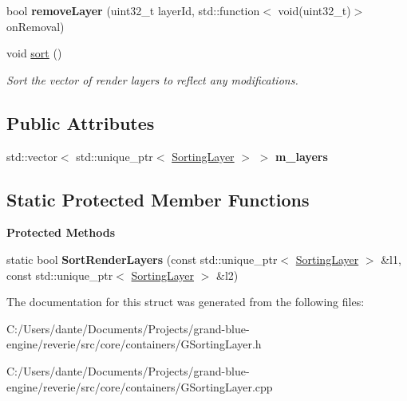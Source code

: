 \begin{DoxyCompactItemize}
\mbox{\label{structrev_1_1_sorting_layers_ad21276d3f1bbfc243c28c5a69580fe5d}} 
bool {\bfseries remove\+Layer} (uint32\+\_\+t layer\+Id, std\+::function$<$ void(uint32\+\_\+t)$>$ on\+Removal)
\item 
\mbox{\label{structrev_1_1_sorting_layers_a1a3e2f464d22ad1096144b57239e0ac3}} 
void \mbox{\hyperlink{structrev_1_1_sorting_layers_a1a3e2f464d22ad1096144b57239e0ac3}{sort}} ()
\begin{DoxyCompactList}\small\item\em Sort the vector of render layers to reflect any modifications. \end{DoxyCompactList}\end{DoxyCompactItemize}
\subsection*{Public Attributes}
\begin{DoxyCompactItemize}
\item 
\mbox{\label{structrev_1_1_sorting_layers_a49f65706af0d9bc9be933516f9cce5f9}} 
std\+::vector$<$ std\+::unique\+\_\+ptr$<$ \mbox{\hyperlink{structrev_1_1_sorting_layer}{Sorting\+Layer}} $>$ $>$ {\bfseries m\+\_\+layers}
\end{DoxyCompactItemize}
\subsection*{Static Protected Member Functions}
\begin{Indent}\textbf{ Protected Methods}\par
\begin{DoxyCompactItemize}
\item 
\mbox{\label{structrev_1_1_sorting_layers_a2fcc51b616004d857c8cf8a3638d1f7f}} 
static bool {\bfseries Sort\+Render\+Layers} (const std\+::unique\+\_\+ptr$<$ \mbox{\hyperlink{structrev_1_1_sorting_layer}{Sorting\+Layer}} $>$ \&l1, const std\+::unique\+\_\+ptr$<$ \mbox{\hyperlink{structrev_1_1_sorting_layer}{Sorting\+Layer}} $>$ \&l2)
\end{DoxyCompactItemize}
\end{Indent}


The documentation for this struct was generated from the following files\+:\begin{DoxyCompactItemize}
\item 
C\+:/\+Users/dante/\+Documents/\+Projects/grand-\/blue-\/engine/reverie/src/core/containers/G\+Sorting\+Layer.\+h\item 
C\+:/\+Users/dante/\+Documents/\+Projects/grand-\/blue-\/engine/reverie/src/core/containers/G\+Sorting\+Layer.\+cpp\end{DoxyCompactItemize}
